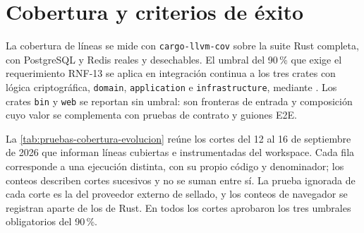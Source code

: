 
\section{Cobertura y criterios de éxito}\label{sec:pruebas-cobertura}

La cobertura de líneas se mide con \texttt{cargo-llvm-cov} sobre la suite Rust completa, con PostgreSQL y Redis reales y desechables. El umbral del 90\,\% que exige el requerimiento RNF-13 se aplica en integración continua a los tres crates con lógica criptográfica, \texttt{domain}, \texttt{application} e \texttt{infrastructure}, mediante . Los crates \texttt{bin} y \texttt{web} se reportan sin umbral: son fronteras de entrada y composición cuyo valor se complementa con pruebas de contrato y guiones E2E.

La \cref{tab:pruebas-cobertura-evolucion} reúne los cortes del 12 al 16 de septiembre de 2026 que informan líneas cubiertas e instrumentadas del workspace. Cada fila corresponde a una ejecución distinta, con su propio código y denominador; los conteos describen cortes sucesivos y no se suman entre sí. La prueba ignorada de cada corte es la del proveedor externo de sellado, y los conteos de navegador se registran aparte de los de Rust. En todos los cortes aprobaron los tres umbrales obligatorios del 90\,\%.

